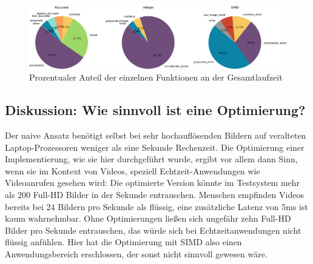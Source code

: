 \documentclass[course=erap]{aspdoc}
\begin{document}
\begin{figure}
    \centering
    \includegraphics[width=\linewidth]{Image/Laufzeit/profiling.png}
    \caption{Prozentualer Anteil der einzelnen Funktionen an der Gesamtlaufzeit}
    \label{fig:profiling}
\end{figure}

\subsection{Diskussion: Wie sinnvoll ist eine Optimierung?}
Der naive Ansatz benötigt selbst bei sehr hochauflösenden Bildern auf veralteten Laptop-Prozessoren weniger als eine Sekunde Rechenzeit. Die Optimierung einer Implementierung, wie sie hier durchgeführt wurde, ergibt vor allem dann Sinn, wenn sie im Kontext von Videos, speziell Echtzeit-Anwendungen wie Videoanrufen gesehen wird: Die optimierte Version könnte im Testsystem mehr als 200 Full-HD Bilder in der Sekunde entrauschen. Menschen empfinden Videos bereits bei 24 Bildern pro Sekunde als flüssig, eine zusätzliche Latenz von 5ms ist kaum wahrnehmbar. Ohne Optimierungen ließen sich ungefähr zehn Full-HD Bilder pro Sekunde entrauschen, das würde sich bei Echtzeitanwendungen nicht flüssig anfühlen. Hier hat die Optimierung mit SIMD also einen Anwendungsbereich erschlossen, der sonst nicht sinnvoll gewesen wäre.
\end{document}
